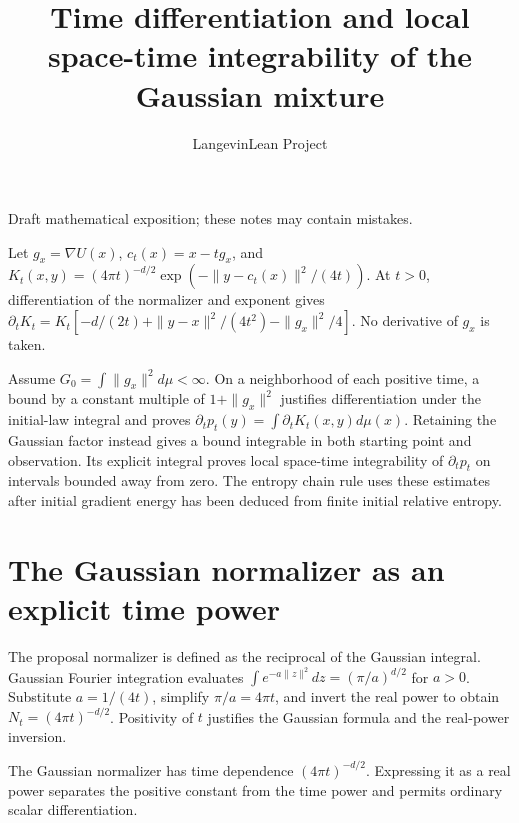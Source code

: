\documentclass[11pt,a4paper]{article}
\title{\texorpdfstring{Time differentiation and local space-time integrability of the Gaussian mixture}{Time differentiation and local space-time integrability of the Gaussian mixture}}
\author{LangevinLean Project}
\date{}
\begin{document}
\maketitle
Draft mathematical exposition; these notes may contain mistakes.


Let \(g_x=\nabla U(x)\), \(c_t(x)=x-tg_x\), and \(K_t(x,y)=(4\pi t)^{-d/2}\exp(-\|y-c_t(x)\|^2/(4t))\). At \(t>0\), differentiation of the normalizer and exponent gives \(\partial_tK_t=K_t[-d/(2t)+\|y-x\|^2/(4t^2)-\|g_x\|^2/4]\). No derivative of \(g_x\) is taken.



Assume \(G_0=\int\|g_x\|^2d\mu<\infty\). On a neighborhood of each positive time, a bound by a constant multiple of \(1+\|g_x\|^2\) justifies differentiation under the initial-law integral and proves \(\partial_tp_t(y)=\int\partial_tK_t(x,y)d\mu(x)\). Retaining the Gaussian factor instead gives a bound integrable in both starting point and observation. Its explicit integral proves local space-time integrability of \(\partial_tp_t\) on intervals bounded away from zero. The entropy chain rule uses these estimates after initial gradient energy has been deduced from finite initial relative entropy.


\section{\texorpdfstring{The Gaussian normalizer as an explicit time power}{The Gaussian normalizer as an explicit time power}}


The proposal normalizer is defined as the reciprocal of the Gaussian integral. Gaussian Fourier integration evaluates \(\int e^{-a\|z\|^2}dz=(\pi/a)^{d/2}\) for \(a>0\). Substitute \(a=1/(4t)\), simplify \(\pi/a=4\pi t\), and invert the real power to obtain \(N_t=(4\pi t)^{-d/2}\). Positivity of \(t\) justifies the Gaussian formula and the real-power inversion.



The Gaussian normalizer has time dependence \((4\pi t)^{-d/2}\). Expressing it as a real power separates the positive constant from the time power and permits ordinary scalar differentiation.
\end{document}
